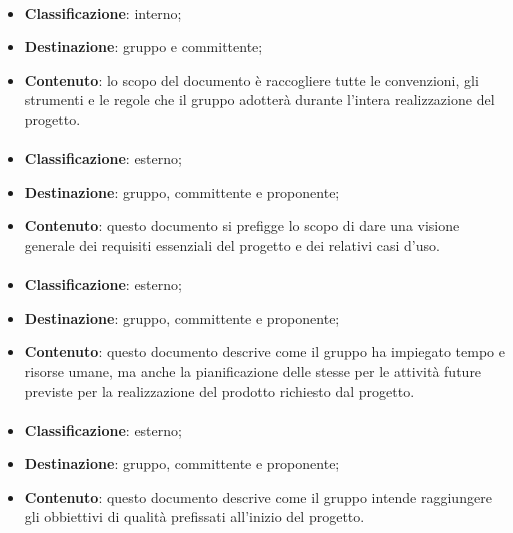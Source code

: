			\paragraph{\NdP}
			\begin{itemize}
				\item \textbf{Classificazione}: interno;
				\item \textbf{Destinazione}: gruppo e committente;
				\item \textbf{Contenuto}: lo scopo del documento è raccogliere tutte le convenzioni, gli strumenti e le regole che il gruppo \textit{\gruppo} adotterà durante l'intera realizzazione del progetto. 
			\end{itemize}	

			\paragraph{\AdR}
			\begin{itemize}
				\item \textbf{Classificazione}: esterno;
				\item \textbf{Destinazione}: gruppo, committente e proponente;
				\item \textbf{Contenuto}: questo documento si prefigge lo scopo di dare una visione generale dei requisiti essenziali del progetto e dei relativi casi d'uso.
			\end{itemize}

			\paragraph{\PdP}
			\begin{itemize}
				\item \textbf{Classificazione}: esterno;
				\item \textbf{Destinazione}: gruppo, committente e proponente;
				\item \textbf{Contenuto}: questo documento descrive come il gruppo \textit{\gruppo} ha impiegato tempo e risorse umane, ma anche la pianificazione delle stesse per le attività future previste per la realizzazione del prodotto richiesto dal progetto.
			\end{itemize}

			\paragraph{\PdQ}
			\begin{itemize}
				\item \textbf{Classificazione}: esterno;
				\item \textbf{Destinazione}: gruppo, committente e proponente;
				\item \textbf{Contenuto}: questo documento descrive come il gruppo \textit{\gruppo} intende raggiungere gli obbiettivi di qualità prefissati all’inizio del progetto.
			\end{itemize}

